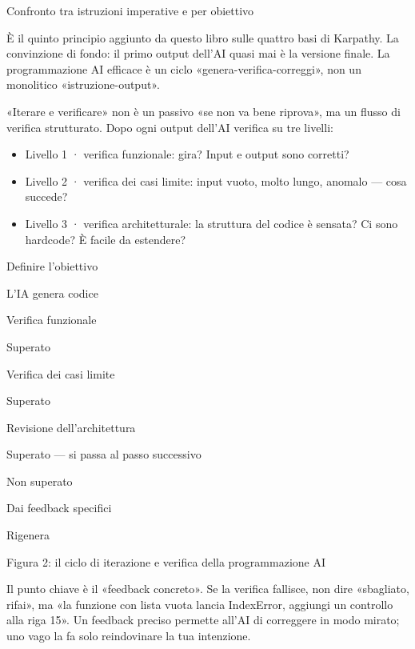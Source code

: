\begin{center}\small\color{gray}Confronto tra istruzioni imperative e per obiettivo\end{center}


È il quinto principio aggiunto da questo libro sulle quattro basi di Karpathy. La convinzione di fondo: il primo output dell'AI quasi mai è la versione finale. La programmazione AI efficace è un ciclo «genera-verifica-correggi», non un monolitico «istruzione-output».

«Iterare e verificare» non è un passivo «se non va bene riprova», ma un flusso di verifica strutturato. Dopo ogni output dell'AI verifica su tre livelli:

\begin{itemize}
  \item Livello 1 · verifica funzionale: gira? Input e output sono corretti?
  \item Livello 2 · verifica dei casi limite: input vuoto, molto lungo, anomalo — cosa succede?
  \item Livello 3 · verifica architetturale: la struttura del codice è sensata? Ci sono hardcode? È facile da estendere?
\end{itemize}

Definire l'obiettivo

L'IA genera codice

Verifica funzionale

Superato

Verifica dei casi limite

Superato

Revisione dell'architettura

Superato — si passa al passo successivo

Non superato

Dai feedback specifici

Rigenera

\begin{center}\small\color{gray}Figura 2: il ciclo di iterazione e verifica della programmazione AI\end{center}

Il punto chiave è il «feedback concreto». Se la verifica fallisce, non dire «sbagliato, rifai», ma «la funzione con lista vuota lancia IndexError, aggiungi un controllo alla riga 15». Un feedback preciso permette all'AI di correggere in modo mirato; uno vago la fa solo reindovinare la tua intenzione.

